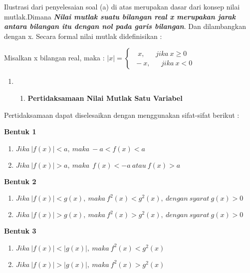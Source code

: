 \documentclass[11pt,fleqn]{book} %
\begin{document}
\noindent 

\noindent Ilustrasi dari penyelesaian soal (a) di atas merupakan dasar dari konsep nilai mutlak.Dimana \textbf{\textit{Nilai mutlak suatu bilangan real x merupakan jarak antara bilangan itu dengan nol pada garis bilangan}}. Dan dilambangkan dengan x. Secara formal nilai mutlak didefinisikan :

\noindent Misalkan x bilangan real, maka : $\left|x\right|=\left\{ \begin{array}{c}
\ \ \ x,\ \ \ \ \ \ \ jika\ x\ge 0 \\ 
\ -x,\ \ \ \ \ \ \ jika\ x<0 \end{array}
\right.$

\noindent 

\begin{enumerate}
\item \begin{enumerate}
\item  \textbf{Pertidaksamaan Nilai Mutlak Satu Variabel}
\end{enumerate}
\end{enumerate}

\noindent Pertidaksamaan dapat diselesaikan dengan menggunakan sifat-sifat berikut :

\noindent \textbf{Bentuk 1}

\begin{enumerate}
\item \textbf{ }$Jika\ \left|f\left(x\right)\right|<a,\ maka\ -a<f\left(x\right)<a\ $

\item  $Jika\ \left|f\left(x\right)\right|>a,\ maka\ \ f\left(x\right)<-a\ atau\ f\left(x\right)>a$
\end{enumerate}

\noindent \textbf{Bentuk 2}

\begin{enumerate}
\item \textbf{ }$Jika\ \left|f\left(x\right)\right|<g\left(x\right),\ maka\ f^2\left(x\right)<g^2\left(x\right),\ dengan\ syarat\ g\left(x\right)>0\ $

\item  $Jika\ \left|f\left(x\right)\right|>g\left(x\right),\ maka\ f^2\left(x\right)>g^2\left(x\right),\ dengan\ syarat\ g\left(x\right)>0\ $
\end{enumerate}

\noindent \textbf{Bentuk 3}

\begin{enumerate}
\item \textbf{ }$Jika\ \left|f\left(x\right)\right|<\left|g\left(x\right)\right|,\ maka\ f^2\left(x\right)<g^2\left(x\right)\ $

\item  $Jika\ \left|f\left(x\right)\right|>\left|g\left(x\right)\right|,\ maka\ f^2\left(x\right)>g^2\left(x\right)$
\end{enumerate}
\end{document}

